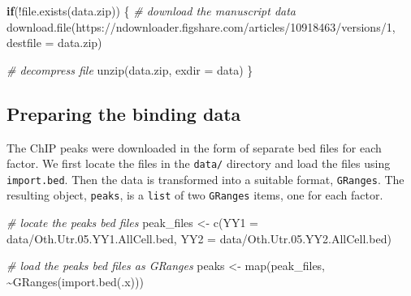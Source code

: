 \documentclass[9pt,a4paper,]{extarticle}
\newenvironment{Shaded}{\begin{snugshade}}{\end{snugshade}}
\newcommand{\AttributeTok}[1]{\textcolor[rgb]{0.77,0.63,0.00}{#1}}
\newcommand{\CommentTok}[1]{\textcolor[rgb]{0.56,0.35,0.01}{\textit{#1}}}
\newcommand{\ControlFlowTok}[1]{\textcolor[rgb]{0.13,0.29,0.53}{\textbf{#1}}}
\newcommand{\FunctionTok}[1]{\textcolor[rgb]{0.00,0.00,0.00}{#1}}
\newcommand{\NormalTok}[1]{#1}
\newcommand{\OtherTok}[1]{\textcolor[rgb]{0.56,0.35,0.01}{#1}}
\newcommand{\SpecialCharTok}[1]{\textcolor[rgb]{0.00,0.00,0.00}{#1}}
\newcommand{\StringTok}[1]{\textcolor[rgb]{0.31,0.60,0.02}{#1}}
\begin{document}
\begin{Shaded}
\begin{Highlighting}[]
\ControlFlowTok{if}\NormalTok{(}\SpecialCharTok{!}\FunctionTok{file.exists}\NormalTok{(}\StringTok{\textquotesingle{}data.zip\textquotesingle{}}\NormalTok{)) \{}
  \CommentTok{\# download the manuscript data}
  \FunctionTok{download.file}\NormalTok{(}\StringTok{\textquotesingle{}https://ndownloader.figshare.com/articles/10918463/versions/1\textquotesingle{}}\NormalTok{,}
                \AttributeTok{destfile =} \StringTok{\textquotesingle{}data.zip\textquotesingle{}}\NormalTok{)}
  
  \CommentTok{\# decompress file}
  \FunctionTok{unzip}\NormalTok{(}\StringTok{\textquotesingle{}data.zip\textquotesingle{}}\NormalTok{, }\AttributeTok{exdir =} \StringTok{\textquotesingle{}data\textquotesingle{}}\NormalTok{)}
\NormalTok{\}}
\end{Highlighting}
\end{Shaded}

\hypertarget{preparing-the-binding-data}{%
\subsection{Preparing the binding data}\label{preparing-the-binding-data}}

The ChIP peaks were downloaded in the form of separate bed files for each factor. We first locate the files in the \texttt{data/} directory and load the files using \texttt{import.bed}. Then the data is transformed into a suitable format, \texttt{GRanges}. The resulting object, \texttt{peaks}, is a \texttt{list} of two \texttt{GRanges} items, one for each factor.

\begin{Shaded}
\begin{Highlighting}[]
\CommentTok{\# locate the peaks bed files}
\NormalTok{peak\_files }\OtherTok{\textless{}{-}} \FunctionTok{c}\NormalTok{(}\AttributeTok{YY1 =} \StringTok{\textquotesingle{}data/Oth.Utr.05.YY1.AllCell.bed\textquotesingle{}}\NormalTok{,}
                \AttributeTok{YY2 =} \StringTok{\textquotesingle{}data/Oth.Utr.05.YY2.AllCell.bed\textquotesingle{}}\NormalTok{)}

\CommentTok{\# load the peaks bed files as GRanges}
\NormalTok{peaks }\OtherTok{\textless{}{-}} \FunctionTok{map}\NormalTok{(peak\_files, }\SpecialCharTok{\textasciitilde{}}\FunctionTok{GRanges}\NormalTok{(}\FunctionTok{import.bed}\NormalTok{(.x)))}
\end{Highlighting}
\end{Shaded}
\end{document}
